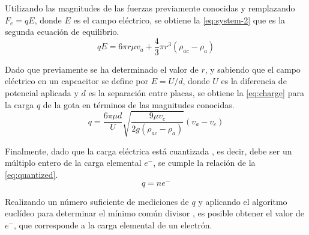 Utilizando las magnitudes de las fuerzas previamente conocidas y remplazando
\(F_e=qE \), donde $E$ es el campo eléctrico, se obtiene la \cref{eq:system-2}
que es la segunda ecuación de equilibrio.
\begin{equation}\label{eq:system-2}
    qE = 6\pi r\mu v_a + \frac{4}{3}\pi r^3(\rho_{ac}-\rho_a)
\end{equation}

Dado que previamente se ha determinado el valor de \(r\), y sabiendo que el campo
eléctrico en un capcacitor se define por \( E = U / d \), donde $U$ es la
diferencia de potencial aplicada y $d$ es la separación entre placas, se obtiene
la \cref{eq:charge} para la carga \(q\) de la gota en términos de las magnitudes
conocidas.
\begin{equation}\label{eq:charge}
    q = \frac{6\pi \mu d}{U}\sqrt{\frac{9\mu v_c}{2g(\rho_{ac}-\rho_a)}}(v_a-v_c)
\end{equation}

Finalmente, dado que la carga eléctrica está cuantizada \cite{}, es decir,
debe ser un múltiplo entero de la carga elemental \(e^{-}\), se cumple la
relación de la \cref{eq:quantized}.
\begin{equation}\label{eq:quantized}
    q=ne^-
\end{equation}

Realizando un número suficiente de mediciones de \(q\) y aplicando el algoritmo
euclídeo para determinar el mínimo común divisor \cite{}, es posible obtener el
valor de \(e^{-}\), que corresponde a la carga elemental de un electrón.
